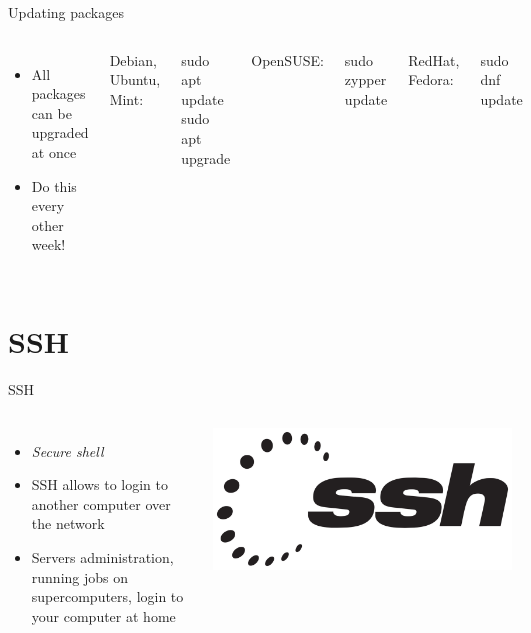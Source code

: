     \begin{frame}[t,fragile]{Updating packages}
        \begin{columns}[T]
            \begin{itemize}
                \item All packages can be upgraded at once
                \item Do this every other week!
            \end{itemize}
            Debian, Ubuntu, Mint:
            \begin{bashenv}[\small]
sudo apt update
sudo apt upgrade
            \end{bashenv}
            OpenSUSE:
            \begin{bashenv}[\small]
sudo zypper update
            \end{bashenv}
            RedHat, Fedora:
            \begin{bashenv}[\small]
sudo dnf update
            \end{bashenv}
        \end{columns}
    \end{frame}

    \section{SSH}

    \begin{frame}[t,fragile]{SSH}
        \begin{columns}[T]
            \begin{itemize}
                \item \emph{Secure shell}
                \item SSH allows to login to another computer over the network
                \item Servers administration, running jobs on supercomputers,
                    login to your computer at home
            \end{itemize}
            \begin{center}
                \includegraphics[width=0.6\columnwidth]{img/ssh.png}
            \end{center}
        \end{columns}
    \end{frame}

